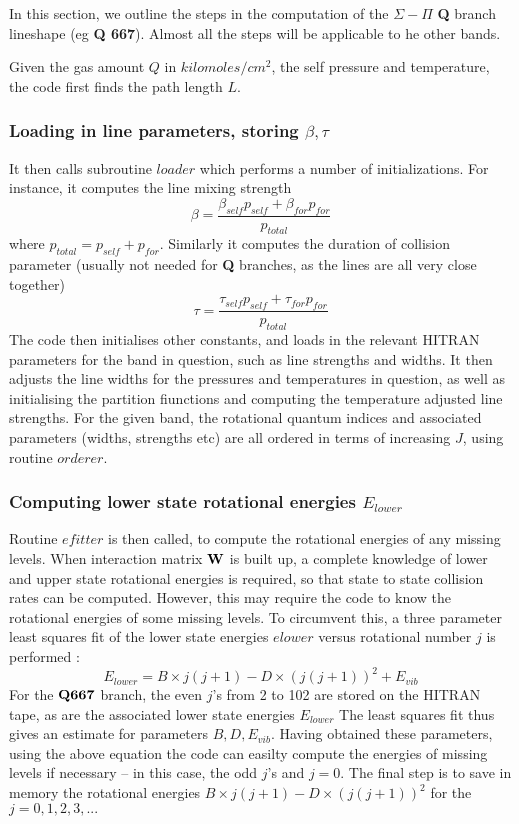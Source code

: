 \documentclass[11pt]{article}
\begin{document}
In this section, we outline the steps in the computation of the $\Sigma-\Pi$
{\bf Q} branch lineshape (eg {\bf Q 667}). Almost all the steps will be 
applicable to he other bands.

Given the gas amount $Q$ in $kilomoles/cm^{2}$, the self pressure and 
temperature, the code first finds the path length $L$. 

\subsubsection{Loading in line parameters, storing $\beta, \tau$}
It then calls subroutine $loader$ which performs a number of 
initializations. For instance, it computes the line mixing strength
\[
\beta = \frac{\beta_{self}p_{self} + \beta_{for}p_{for}}{p_{total}}
\]
where $p_{total} = p_{self} + p_{for}$. Similarly it computes the duration 
of collision parameter (usually not needed for {\bf Q} branches, as the 
lines are all very close together)
\[
\tau = \frac{\tau_{self}p_{self} + \tau_{for}p_{for}}{p_{total}}
\]
The code then initialises other constants, and loads in the relevant
HITRAN parameters for the band in question, such as line strengths and 
widths. It then adjusts the line widths for the pressures and temperatures
in question, as well as initialising the partition fiunctions and computing
the temperature adjusted line strengths. For the given band, the rotational
quantum indices and associated parameters (widths, strengths etc) are all
ordered in terms of increasing $J$, using routine $orderer$.

\subsubsection{Computing lower state rotational energies $E_{lower}$}
Routine $efitter$ is then called, to compute the rotational energies of any 
missing levels. When interaction matrix ${\bf W}$ is built up, a 
complete knowledge of lower and upper state rotational energies is required,
so that state to state collision rates can be computed. However, this
may require the code to know the rotational energies of some missing levels.
To circumvent this, a three parameter least squares fit of the lower
state energies $elower$ versus rotational number $j$ is performed : 
\[
E_{lower} = B \times j(j+1) - D \times (j(j+1))^{2} + E_{vib}
\]
For the ${\bf Q 667}$ branch, the even $j$'s from 2 to 102 are stored on the
HITRAN tape, as are the associated lower state energies $E_{lower}$
The least squares fit thus gives an estimate for parameters $B,D,E_{vib}$.
Having obtained these parameters, using the above equation the code can 
easilty compute the energies of missing levels if necessary -- in this 
case, the odd $j$'s and $j=0$. The final step is to save in memory the
rotational energies $B \times j(j+1) - D \times (j(j+1))^{2}$ for the 
$j=0,1,2,3,...$
\end{document}
